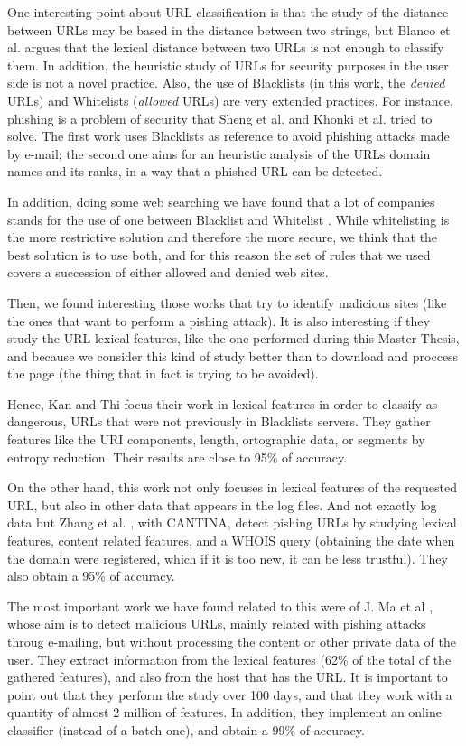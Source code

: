 \documentclass{llncs}
\begin{document}
One interesting point about URL classification is that the study of the distance between URLs may be based in the distance between two strings, but Blanco et al. \cite{Blanco2011} argues that the lexical distance between two URLs is not enough to classify them. In addition, the heuristic study of URLs for security purposes in the user side is not a novel practice. Also, the use of Blacklists (in this work, the \textit{denied} URLs) and Whitelists (\textit{allowed} URLs) are very extended practices. For instance, phishing is a problem of security that Sheng et al.  and Khonki et al. \cite{Khonji2011} tried to solve. The first work uses Blacklists as reference to avoid phishing attacks made by e-mail; the second one aims for an heuristic analysis of the URLs domain names and its ranks, in a way that a phished URL can be detected.

In addition, doing some web searching we have found that a lot of companies stands for the use of one between Blacklist and Whitelist \cite{whiteblack_list}. While whitelisting is the more restrictive solution and therefore the more secure, we think that the best solution is to use both, and for this reason the set of rules that we used covers a succession of either allowed and denied web sites.

Then, we found interesting those works that try to identify malicious sites (like the ones that want to perform a pishing attack). It is also interesting if they study the URL lexical features, like the one performed during this Master Thesis, and because we consider this kind of study better than to download and proccess the page (the thing that in fact is trying to be avoided). 

Hence, Kan and Thi \cite{Kan_URL05} focus their work in lexical features in order to classify as dangerous, URLs that were not previously in Blacklists servers. They gather features like the URI components, length, ortographic data, or segments by entropy reduction. Their results are close to 95\% of accuracy.

On the other hand, this work not only focuses in lexical features of the requested URL, but also in other data that appears in the log files. And not exactly log data but Zhang et al. \cite{Zhang_cantina07}, with CANTINA, detect pishing URLs by studying lexical features, content related features, and a WHOIS query (obtaining the date when the domain were registered, which if it is too new, it can be less trustful). They also obtain a 95\% of accuracy.

The most important work we have found related to this were of J. Ma et al \cite{Ma_Url11}, whose aim is to detect malicious URLs, mainly related with pishing attacks throug e-mailing, but without processing the content or other private data of the user. They extract information from the lexical features (62\% of the total of the gathered features), and also from the host that has the URL. It is important to point out that they perform the study over 100 days, and that they work with a quantity of almost 2 million of features. In addition, they implement an online classifier (instead of a batch one), and obtain a 99\% of accuracy. 
\end{document}

